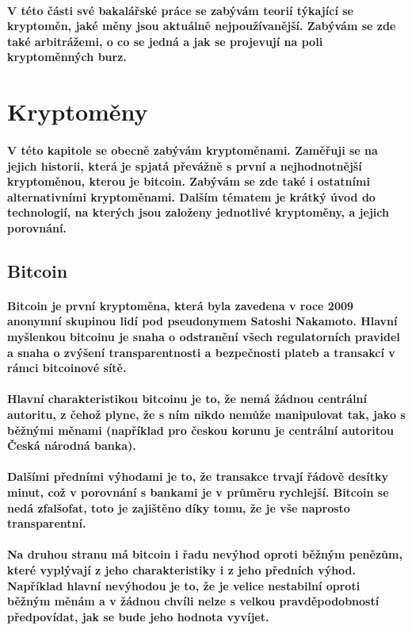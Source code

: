 \documentclass[thesis=B,czech]{FITthesis}[2019/03/21]
\begin{document}
\paragraph{
V této části své bakalářské práce se zabývám teorií týkající se kryptoměn, jaké měny jsou aktuálně nejpoužívanější. Zabývám se zde také arbitrážemi, o co se jedná a jak se projevují na poli kryptoměnných burz.
}
\section{Kryptoměny}
\paragraph{
V této kapitole se obecně zabývám kryptoměnami. Zaměřuji se na jejich historii, která je spjatá převážně s první a nejhodnotnější kryptoměnou, kterou je bitcoin. Zabývám se zde také i ostatními alternativními kryptoměnami. 
Dalším tématem je krátký úvod do technologií, na kterých jsou založeny jednotlivé kryptoměny, a jejich porovnání. \cite{BudoucnostFinTrhu}  \cite{svgspec}
}
\subsection{Bitcoin}
\paragraph{
Bitcoin je první kryptoměna, která byla zavedena v roce 2009 anonymní skupinou lidí pod pseudonymem Satoshi Nakamoto. Hlavní myšlenkou bitcoinu je snaha o odstranění všech regulatorních pravidel a snaha o zvýšení transparentnosti a bezpečnosti plateb a transakcí v rámci bitcoinové sítě. \cite{Finex}
}
\paragraph{
Hlavní charakteristikou bitcoinu je to, že nemá žádnou centrální autoritu, z čehož plyne, že s ním nikdo nemůže manipulovat tak, jako s běžnými měnami (například pro českou korunu je centrální autoritou Česká národná banka).
}
\paragraph{
Dalšími předními výhodami je to, že transakce trvají řádově desítky minut, což v porovnání s bankami je v průměru rychlejší. Bitcoin se nedá zfalšofat, toto je zajištěno díky tomu, že je vše naprosto transparentní. 
}
\paragraph{
Na druhou stranu má bitcoin i řadu nevýhod oproti běžným penězům, které vyplývají z jeho charakteristiky i z jeho předních výhod. Například hlavní nevýhodou je to, že je velice nestabilní oproti běžným měnám a v žádnou chvíli nelze s velkou pravděpodobností předpovídat, jak se bude jeho hodnota vyvíjet. 
}
\end{document}
